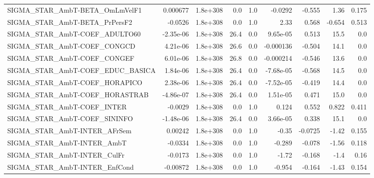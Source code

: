 \begin{tabular}{lrrrrrrrr}
SIGMA\_STAR\_AmbT-BETA\_OmLmVelF1        &    0.000677 &     1.8e+308 &     0.0 &      1.0 &    -0.0292 &      -0.555 &         1.36 &         0.175 \\
SIGMA\_STAR\_AmbT-BETA\_PrPersF2         &     -0.0526 &     1.8e+308 &     0.0 &      1.0 &       2.33 &       0.568 &       -0.654 &         0.513 \\
SIGMA\_STAR\_AmbT-COEF\_ADULTO60         &   -2.35e-06 &     1.8e+308 &    26.4 &      0.0 &   9.65e-05 &       0.513 &         15.5 &           0.0 \\
SIGMA\_STAR\_AmbT-COEF\_CONGCD           &    4.21e-06 &     1.8e+308 &    26.6 &      0.0 &  -0.000136 &      -0.504 &         14.1 &           0.0 \\
SIGMA\_STAR\_AmbT-COEF\_CONGEF           &    6.01e-06 &     1.8e+308 &    26.8 &      0.0 &  -0.000214 &      -0.546 &         13.6 &           0.0 \\
SIGMA\_STAR\_AmbT-COEF\_EDUC\_BASICA      &    1.84e-06 &     1.8e+308 &    26.4 &      0.0 &  -7.68e-05 &      -0.568 &         14.5 &           0.0 \\
SIGMA\_STAR\_AmbT-COEF\_HORAPICO         &    2.38e-06 &     1.8e+308 &    26.4 &      0.0 &  -7.52e-05 &      -0.419 &         14.4 &           0.0 \\
SIGMA\_STAR\_AmbT-COEF\_HORASTRAB        &   -4.86e-07 &     1.8e+308 &    26.4 &      0.0 &   1.51e-05 &       0.471 &         15.0 &           0.0 \\
SIGMA\_STAR\_AmbT-COEF\_INTER            &     -0.0029 &     1.8e+308 &     0.0 &      1.0 &      0.124 &       0.552 &        0.822 &         0.411 \\
SIGMA\_STAR\_AmbT-COEF\_SININFO          &   -1.48e-06 &     1.8e+308 &    26.4 &      0.0 &   3.66e-05 &       0.338 &         15.1 &           0.0 \\
SIGMA\_STAR\_AmbT-INTER\_AFrSem          &     0.00242 &     1.8e+308 &     0.0 &      1.0 &      -0.35 &     -0.0725 &        -1.42 &         0.155 \\
SIGMA\_STAR\_AmbT-INTER\_AmbT            &     -0.0334 &     1.8e+308 &     0.0 &      1.0 &     -0.289 &      -0.078 &        -1.56 &         0.118 \\
SIGMA\_STAR\_AmbT-INTER\_CulFr           &     -0.0173 &     1.8e+308 &     0.0 &      1.0 &      -1.72 &      -0.168 &         -1.4 &          0.16 \\
SIGMA\_STAR\_AmbT-INTER\_EnfCond         &    -0.00872 &     1.8e+308 &     0.0 &      1.0 &     -0.954 &      -0.164 &        -1.43 &         0.154 \\

\end{tabular}

